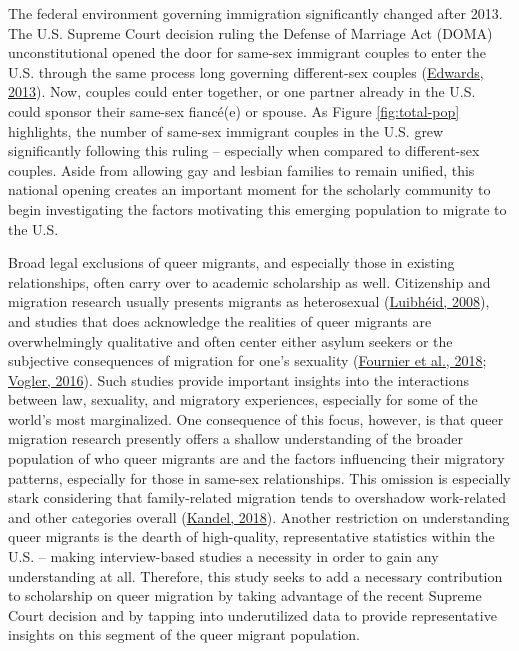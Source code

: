 \documentclass[
  12pt,
]{article}
\begin{document}
The federal environment governing immigration significantly changed after 2013. The U.S. Supreme Court decision ruling the Defense of Marriage Act (DOMA) unconstitutional opened the door for same-sex immigrant couples to enter the U.S. through the same process long governing different-sex couples (\protect\hyperlink{ref-edwards_2013}{Edwards, 2013}). Now, couples could enter together, or one partner already in the U.S. could sponsor their same-sex fiancé(e) or spouse. As Figure \ref{fig:total-pop} highlights, the number of same-sex immigrant couples in the U.S. grew significantly following this ruling -- especially when compared to different-sex couples. Aside from allowing gay and lesbian families to remain unified, this national opening creates an important moment for the scholarly community to begin investigating the factors motivating this emerging population to migrate to the U.S.

Broad legal exclusions of queer migrants, and especially those in existing relationships, often carry over to academic scholarship as well. Citizenship and migration research usually presents migrants as heterosexual (\protect\hyperlink{ref-luibheid_2008}{Luibhéid, 2008}), and studies that does acknowledge the realities of queer migrants are overwhelmingly qualitative and often center either asylum seekers or the subjective consequences of migration for one's sexuality (\protect\hyperlink{ref-fournier_2018_lesbian}{Fournier et al., 2018}; \protect\hyperlink{ref-vogler_2016}{Vogler, 2016}). Such studies provide important insights into the interactions between law, sexuality, and migratory experiences, especially for some of the world's most marginalized. One consequence of this focus, however, is that queer migration research presently offers a shallow understanding of the broader population of who queer migrants are and the factors influencing their migratory patterns, especially for those in same-sex relationships. This omission is especially stark considering that family-related migration tends to overshadow work-related and other categories overall (\protect\hyperlink{ref-kandel_2018_familybased}{Kandel, 2018}). Another restriction on understanding queer migrants is the dearth of high-quality, representative statistics within the U.S. -- making interview-based studies a necessity in order to gain any understanding at all. Therefore, this study seeks to add a necessary contribution to scholarship on queer migration by taking advantage of the recent Supreme Court decision and by tapping into underutilized data to provide representative insights on this segment of the queer migrant population.
\end{document}
